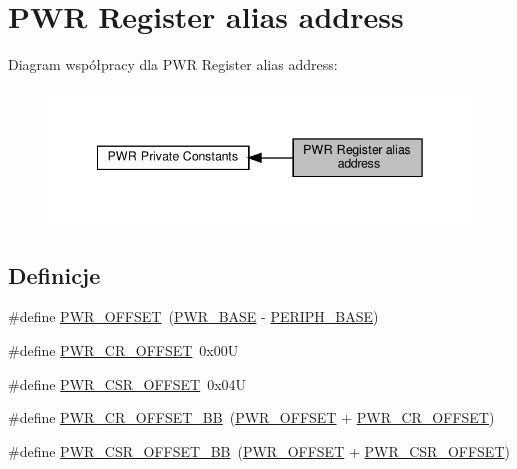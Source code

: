 \hypertarget{group___p_w_r__register__alias__address}{}\section{P\+WR Register alias address}
\label{group___p_w_r__register__alias__address}
Diagram współpracy dla P\+WR Register alias address\+:\nopagebreak
\begin{figure}[H]
\begin{center}
\leavevmode
\includegraphics[width=342pt]{group___p_w_r__register__alias__address}
\end{center}
\end{figure}
\subsection*{Definicje}
\begin{DoxyCompactItemize}
\item 
\#define \hyperlink{group___p_w_r__register__alias__address_ga7f88bce73931300319824f22578f90de}{P\+W\+R\+\_\+\+O\+F\+F\+S\+ET}~(\hyperlink{group___peripheral__memory__map_gac691ec23dace8b7a649a25acb110217a}{P\+W\+R\+\_\+\+B\+A\+SE} -\/ \hyperlink{group___peripheral__memory__map_ga9171f49478fa86d932f89e78e73b88b0}{P\+E\+R\+I\+P\+H\+\_\+\+B\+A\+SE})
\item 
\#define \hyperlink{group___p_w_r__register__alias__address_gafc4a9746ee5df183f01c6c9b2b193bf8}{P\+W\+R\+\_\+\+C\+R\+\_\+\+O\+F\+F\+S\+ET}~0x00U
\item 
\#define \hyperlink{group___p_w_r__register__alias__address_ga5108a7917314663531d70bdf05ea2698}{P\+W\+R\+\_\+\+C\+S\+R\+\_\+\+O\+F\+F\+S\+ET}~0x04U
\item 
\#define \hyperlink{group___p_w_r__register__alias__address_ga387e4e883d6bea5c2223adc42ee72daa}{P\+W\+R\+\_\+\+C\+R\+\_\+\+O\+F\+F\+S\+E\+T\+\_\+\+BB}~(\hyperlink{group___p_w_r__register__alias__address_ga7f88bce73931300319824f22578f90de}{P\+W\+R\+\_\+\+O\+F\+F\+S\+ET} + \hyperlink{group___p_w_r__register__alias__address_gafc4a9746ee5df183f01c6c9b2b193bf8}{P\+W\+R\+\_\+\+C\+R\+\_\+\+O\+F\+F\+S\+ET})
\item 
\#define \hyperlink{group___p_w_r__register__alias__address_gaa9477acfcacc4610533df164c94ad6fd}{P\+W\+R\+\_\+\+C\+S\+R\+\_\+\+O\+F\+F\+S\+E\+T\+\_\+\+BB}~(\hyperlink{group___p_w_r__register__alias__address_ga7f88bce73931300319824f22578f90de}{P\+W\+R\+\_\+\+O\+F\+F\+S\+ET} + \hyperlink{group___p_w_r__register__alias__address_ga5108a7917314663531d70bdf05ea2698}{P\+W\+R\+\_\+\+C\+S\+R\+\_\+\+O\+F\+F\+S\+ET})
\end{DoxyCompactItemize}


